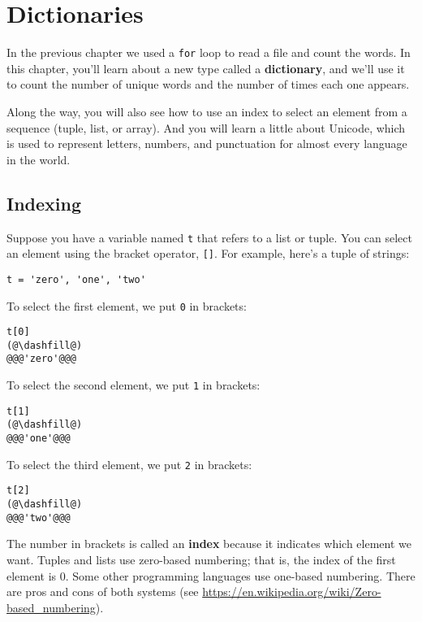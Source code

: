\hypertarget{dictionaries}{%
\chapter{Dictionaries}\label{dictionaries}}

In the previous chapter we used a \passthrough{\lstinline!for!} loop to
read a file and count the words. In this chapter, you'll learn about a
new type called a \textbf{dictionary}, and we'll use it to count the
number of unique words and the number of times each one appears.

Along the way, you will also see how to use an index to select an
element from a sequence (tuple, list, or array). And you will learn a
little about Unicode, which is used to represent letters, numbers, and
punctuation for almost every language in the world.

\hypertarget{indexing}{%
\section{Indexing}\label{indexing}}

Suppose you have a variable named \passthrough{\lstinline!t!} that
refers to a list or tuple. You can select an element using the bracket
operator, \passthrough{\lstinline![]!}. For example, here's a tuple of
strings:

\begin{lstlisting}[]
t = 'zero', 'one', 'two'
\end{lstlisting}

To select the first element, we put \passthrough{\lstinline!0!} in
brackets:

\begin{lstlisting}[]
t[0]
(@\dashfill@)
@@@'zero'@@@
\end{lstlisting}

To select the second element, we put \passthrough{\lstinline!1!} in
brackets:

\begin{lstlisting}[]
t[1]
(@\dashfill@)
@@@'one'@@@
\end{lstlisting}

To select the third element, we put \passthrough{\lstinline!2!} in
brackets:

\begin{lstlisting}[]
t[2]
(@\dashfill@)
@@@'two'@@@
\end{lstlisting}

The number in brackets is called an \textbf{index} because it indicates
which element we want. Tuples and lists use zero-based numbering; that
is, the index of the first element is 0. Some other programming
languages use one-based numbering. There are pros and cons of both
systems (see \url{https://en.wikipedia.org/wiki/Zero-based_numbering}).

